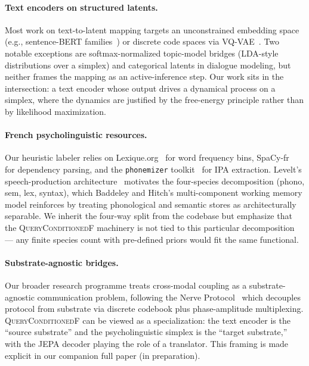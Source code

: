 \paragraph{Text encoders on structured latents.}
Most work on text-to-latent mapping targets an unconstrained
embedding space (e.g., sentence-BERT families~\citep{reimers2019sbert})
or discrete code spaces via VQ-VAE~\citep{vandenoord2017neural}.
Two notable exceptions are softmax-normalized topic-model bridges
(LDA-style distributions over a simplex) and categorical latents in
dialogue modeling, but neither frames the mapping as an active-inference
step. Our work sits in the intersection: a text encoder whose output
drives a dynamical process on a simplex, where the dynamics are
justified by the free-energy principle rather than by likelihood
maximization.

\paragraph{French psycholinguistic resources.}
Our heuristic labeler relies on Lexique.org~\citep{newboucard2004lexique,new2007subtitles}
for word frequency bins, SpaCy-fr~\citep{honnibal2020spacy} for
dependency parsing, and the \texttt{phonemizer}
toolkit~\citep{phonemizer} for IPA extraction.
Levelt's speech-production architecture~\citep{levelt1989speaking}
motivates the four-species decomposition (phono, sem, lex,
syntax), which Baddeley and Hitch's multi-component working memory
model \citep{baddeley1974} reinforces by treating phonological and
semantic stores as architecturally separable. We inherit the
four-way split from the codebase but emphasize that the
\textsc{QueryConditionedF} machinery is not tied to this particular
decomposition --- any finite species count with pre-defined priors
would fit the same functional.

\paragraph{Substrate-agnostic bridges.}
Our broader research programme treats cross-modal coupling as a
substrate-agnostic communication problem, following the Nerve
Protocol~\citep{saillant2026nervewml} which decouples protocol from
substrate via discrete codebook plus phase-amplitude
multiplexing. \textsc{QueryConditionedF} can be viewed as a
specialization: the text encoder is the ``source substrate'' and the
psycholinguistic simplex is the ``target substrate,'' with the JEPA
decoder playing the role of a translator. This framing is made
explicit in our companion full paper (in preparation).
